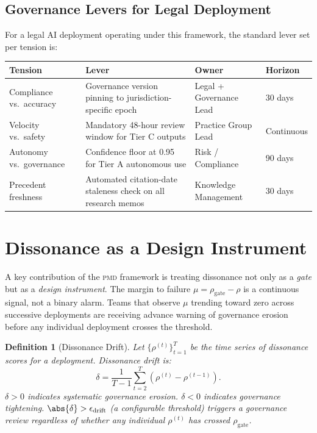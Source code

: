 \documentclass[11pt,letterpaper]{article}
\newtheorem{definition}[theorem]{Definition}
\theoremstyle{remark}
\newcommand{\pmd}{\textsc{pmd}}
\newcommand{\rhogate}{\rho_{\mathrm{gate}}}
\newcommand{\rhosys}{\rho}
\begin{document}
\subsection{Governance Levers for Legal Deployment}

For a legal AI deployment operating under this framework, the standard
lever set per tension is:

\begin{center}
\begin{tabular}{p{3.0cm}p{3.0cm}p{2.2cm}p{2.4cm}}
\toprule
\textbf{Tension} & \textbf{Lever} & \textbf{Owner} & \textbf{Horizon} \\
\midrule
Compliance vs.\ accuracy &
  Governance version pinning to jurisdiction-specific epoch &
  Legal + Governance Lead & 30 days \\
Velocity vs.\ safety &
  Mandatory 48-hour review window for Tier C outputs &
  Practice Group Lead & Continuous \\
Autonomy vs.\ governance &
  Confidence floor at 0.95 for Tier A autonomous use &
  Risk / Compliance & 90 days \\
Precedent freshness &
  Automated citation-date staleness check on all research memos &
  Knowledge Management & 30 days \\
\bottomrule
\end{tabular}
\end{center}

\section{Dissonance as a Design Instrument}
\label{sec:design}

A key contribution of the \pmd{} framework is treating dissonance not
only as a \emph{gate} but as a \emph{design instrument}.  The margin
to failure $\mu = \rhogate - \rhosys$ is a continuous signal, not a
binary alarm.  Teams that observe $\mu$ trending toward zero across
successive deployments are receiving advance warning of governance
erosion before any individual deployment crosses the threshold.

\begin{definition}[Dissonance Drift]
\label{def:drift}
Let $\{\rhosys^{(t)}\}_{t=1}^{T}$ be the time series of dissonance
scores for a deployment.  \emph{Dissonance drift} is:
\[
  \delta = \frac{1}{T-1} \sum_{t=2}^{T} (\rhosys^{(t)} - \rhosys^{(t-1)}).
\]
$\delta > 0$ indicates systematic governance erosion.
$\delta < 0$ indicates governance tightening.
$\abs{\delta} > \epsilon_{\text{drift}}$ (a configurable threshold)
triggers a governance review regardless of whether any individual
$\rhosys^{(t)}$ has crossed $\rhogate$.
\end{definition}
\end{document}
